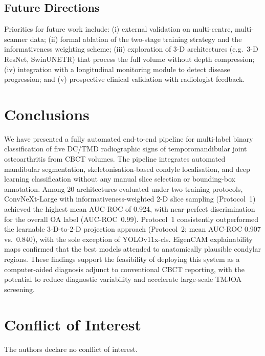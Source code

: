 \documentclass[review,12pt]{elsarticle}
\begin{document}
\subsection{Future Directions}

Priorities for future work include: (i) external validation on
multi-centre, multi-scanner data; (ii) formal ablation of the
two-stage training strategy and the informativeness weighting scheme;
(iii) exploration of 3-D architectures (e.g.\ 3-D ResNet, SwinUNETR)
that process the full volume without depth compression; (iv) integration
with a longitudinal monitoring module to detect disease progression;
and (v) prospective clinical validation with radiologist feedback.

\section{Conclusions}
\label{sec:conc}

We have presented a fully automated end-to-end pipeline for multi-label
binary classification of five DC/TMD radiographic signs of
temporomandibular joint osteoarthritis from CBCT volumes. The pipeline
integrates automated mandibular segmentation, skeletonisation-based
condyle localisation, and deep learning classification without any manual
slice selection or bounding-box annotation. Among 20 architectures
evaluated under two training protocols, ConvNeXt-Large with
informativeness-weighted 2-D slice sampling (Protocol~1) achieved the
highest mean AUC-ROC of 0.924, with near-perfect discrimination for the
overall OA label (AUC-ROC~0.99). Protocol~1 consistently outperformed
the learnable 3-D-to-2-D projection approach (Protocol~2; mean AUC-ROC
0.907 vs.\ 0.840), with the sole exception of YOLOv11x-cls. EigenCAM
explainability maps confirmed that the best models attended to
anatomically plausible condylar regions. These findings support the
feasibility of deploying this system as a computer-aided diagnosis
adjunct to conventional CBCT reporting, with the potential to reduce
diagnostic variability and accelerate large-scale TMJOA screening.

\section*{Conflict of Interest}
The authors declare no conflict of interest.
\end{document}
